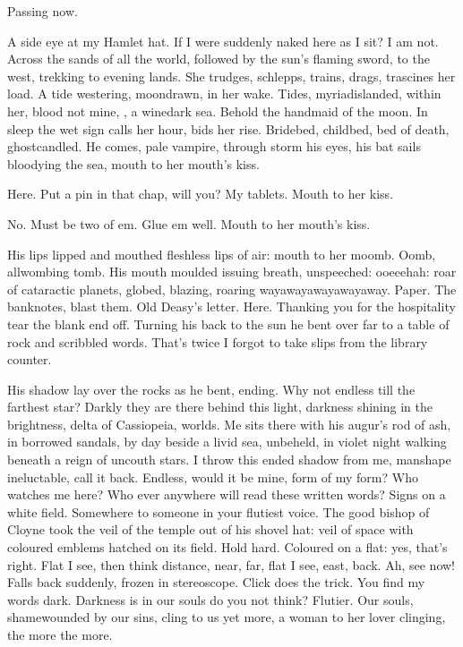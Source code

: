 Passing now.

A side eye at my Hamlet hat.
If I were suddenly naked here as I sit?
I am not.
Across the sands of all the world,
followed by the sun's flaming sword,
to the west, trekking to evening lands.
She trudges, schlepps,
trains, drags, trascines her load.
A tide westering, moondrawn, in her wake.
Tides, myriadislanded, within her,
blood not mine,
,
a winedark sea.
Behold the handmaid of the moon.
In sleep the wet sign calls her hour, bids her rise.
Bridebed, childbed,
bed of death,
ghostcandled.
He comes, pale vampire, through storm
his eyes, his bat sails bloodying the sea,
mouth to her mouth's kiss.

Here.
Put a pin in that chap, will you?
My tablets.
Mouth to her kiss.

No.
Must be two of em.
Glue em well.
Mouth to her mouth's kiss.

His lips lipped and mouthed fleshless lips of air:
mouth to her moomb.
Oomb, allwombing tomb.
His mouth moulded issuing breath, unspeeched:
ooeeehah:
roar of cataractic planets, globed, blazing,
roaring wayawayawayawayaway.
Paper.
The banknotes, blast them.
Old Deasy's letter.
Here.
Thanking you for the hospitality tear the blank end off.
Turning his back to the sun
he bent over far to a table of rock and scribbled words.
That's twice I forgot to take slips from the library counter.

His shadow lay over the rocks as he bent, ending.
Why not endless till the farthest star?
Darkly they are there behind this light,
darkness shining in the brightness,
delta of Cassiopeia, worlds.
Me sits there with his augur's rod of ash,
in borrowed sandals,
by day beside a livid sea,
unbeheld, in violet night
walking beneath a reign of uncouth stars.
I throw this ended shadow from me, manshape ineluctable, call it back.
Endless, would it be mine, form of my form?
Who watches me here?
Who ever anywhere will read these written words?
Signs on a white field.
Somewhere to someone in your flutiest voice.
The good bishop of Cloyne took the veil of the temple
out of his shovel hat:
veil of space with coloured emblems
hatched on its field.
Hold hard.
Coloured on a flat:
yes, that's right.
Flat I see, then think distance,
near, far, flat I see, east, back.
Ah, see now!
Falls back suddenly, frozen in stereoscope.
Click does the trick.
You find my words dark.
Darkness is in our souls do you not think?
Flutier.
Our souls, shamewounded by our sins, cling to us yet more,
a woman to her lover clinging, the more the more.

